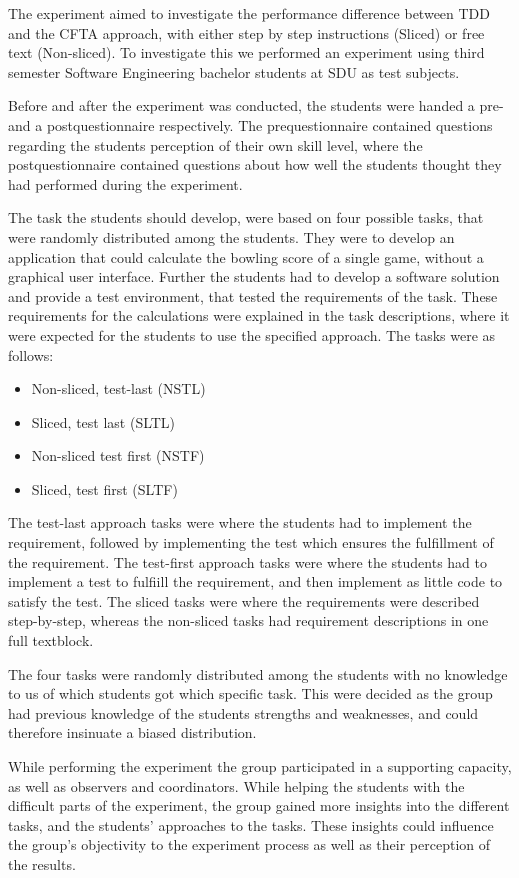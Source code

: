 \documentclass{sig-alternate-05-2015}
\begin{document}
The experiment aimed to investigate the performance difference between TDD and the CFTA approach, with either step by step instructions (Sliced) or free text (Non-sliced). To investigate this we performed an experiment using third semester Software Engineering bachelor students at SDU as test subjects.

Before and after the experiment was conducted, the students were handed a pre- and a postquestionnaire respectively.
The prequestionnaire contained questions regarding the students perception of their own skill level, where the postquestionnaire contained questions about how well the students thought they had performed during the experiment.

The task the students should develop, were based on four possible tasks, that were randomly distributed among the students. They were to develop an application that could calculate the bow\-ling score of a single game, without a graphical user interface. Further the students had to develop a software solution and provide a test environment, that tested the requirements of the task. These requirements for the calculations were explained in the task descriptions, where it were expected for the students to use the specified approach.
The tasks were as follows:
\begin{itemize}
	\item Non-sliced, test-last (NSTL)
	\item Sliced, test last (SLTL)
	\item Non-sliced test first (NSTF)
	\item Sliced, test first (SLTF)
\end{itemize}
The test-last approach tasks were where the students had to implement the requirement, followed by implementing the test which ensures the fulfillment of the requirement.
The test-first approach tasks were where the students had to implement a test to fulfiill the requirement, and then implement as little code to satisfy the test.
The sliced tasks were where the requirements were described step-by-step, whereas the non-sliced tasks had requirement descriptions in one full textblock.

The four tasks were randomly distributed among the students with no knowledge to us of which students got which specific task. This were decided as the group had previous knowledge of the students strengths and weaknesses, and could therefore insinuate a biased distribution.

While performing the experiment the group participated in a supporting capacity, as well as observers and coordinators. While helping the students with the difficult parts of the experiment, the group gained more insights into the different tasks, and the students' approaches to the tasks. These insights could influence the group's objectivity to the experiment process as well as their perception of the results.
\end{document}
